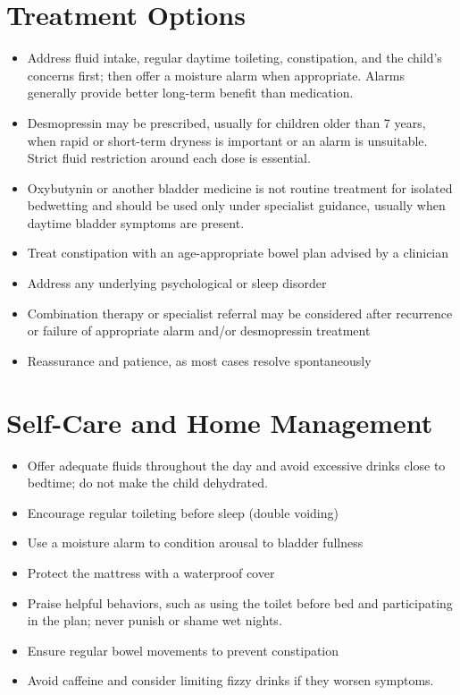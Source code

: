 \section*{Treatment Options}
\begin{itemize}
\item Address fluid intake, regular daytime toileting, constipation, and the child’s concerns first; then offer a moisture alarm when appropriate. Alarms generally provide better long-term benefit than medication.
\item Desmopressin may be prescribed, usually for children older than 7 years, when rapid or short-term dryness is important or an alarm is unsuitable. Strict fluid restriction around each dose is essential.
\item Oxybutynin or another bladder medicine is not routine treatment for isolated bedwetting and should be used only under specialist guidance, usually when daytime bladder symptoms are present.
\item Treat constipation with an age-appropriate bowel plan advised by a clinician
\item Address any underlying psychological or sleep disorder
\item Combination therapy or specialist referral may be considered after recurrence or failure of appropriate alarm and/or desmopressin treatment
\item Reassurance and patience, as most cases resolve spontaneously
\end{itemize}

\section*{Self-Care and Home Management}
\begin{itemize}
\item Offer adequate fluids throughout the day and avoid excessive drinks close to bedtime; do not make the child dehydrated.
\item Encourage regular toileting before sleep (double voiding)
\item Use a moisture alarm to condition arousal to bladder fullness
\item Protect the mattress with a waterproof cover
\item Praise helpful behaviors, such as using the toilet before bed and participating in the plan; never punish or shame wet nights.
\item Ensure regular bowel movements to prevent constipation
\item Avoid caffeine and consider limiting fizzy drinks if they worsen symptoms.
\end{itemize}

